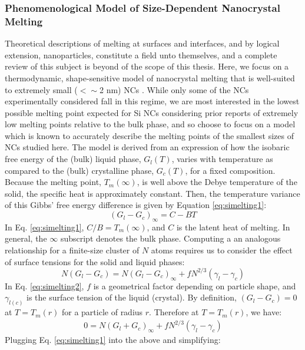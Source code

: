 \subsubsection{Phenomenological Model of Size-Dependent Nanocrystal Melting}
Theoretical descriptions of melting at surfaces and interfaces, and by logical extension, nanoparticles, constitute a field unto themselves, and a complete review of this subject is beyond of the scope of this thesis. Here, we focus on a thermodynamic, shape-sensitive model of nanocrystal melting that is well-suited to extremely small ($< \sim$2 nm) NCs \cite{farrell2007binding, wautelet2003phase}. While only some of the NCs experimentally considered fall in this regime, we are most interested in the lowest possible melting point expected for Si NCs considering prior reports of extremely low melting points relative to the bulk phase, and so choose to focus on a model which is known to accurately describe the melting points of the smallest sizes of NCs studied here. The model is derived from an expression of how the isobaric free energy of the (bulk) liquid phase, $G_l(T)$, varies with temperature as compared to the (bulk) crystalline phase, $G_c(T)$, for a fixed composition. Because the melting point, $T_m(\infty)$, is well above the Debye temperature of the solid, the specific heat is approximately constant. Then, the temperature variance of this Gibbs' free energy difference is given by Equation \ref{eq:simelting1}:
\begin{equation}\label{eq:simelting1}
(G_l - G_c)_{\infty} = C - BT
\end{equation}
In Eq. \ref{eq:simelting1}, $C/B = T_m(\infty)$, and $C$ is the latent heat of melting. In general, the $\infty$ subscript denotes the bulk phase. Computing a an analogous relationship for a finite-size cluster of $N$ atoms requires us to consider the effect of surface tensions for the solid and liquid phases:
\begin{equation}\label{eq:simelting2}
N(G_l - G_c) = N(G_l - G_c)_{\infty} + fN^{2/3}(\gamma_l - \gamma_c)
\end{equation}
In Eq. \ref{eq:simelting2}, $f$ is a geometrical factor depending on particle shape, and $\gamma_{l\left(c\right)}$ is the surface tension of the liquid (crystal). By definition, $(G_l - G_c) = 0$ at $T = T_m(r)$ for a particle of radius $r$. Therefore at $T = T_m(r)$, we have:
\begin{align*}
0 = N(G_l + G_c)_{\infty} + fN^{2/3}(\gamma_l - \gamma_c) 
\end{align*}
Plugging Eq. \ref{eq:simelting1} into the above and simplifying:
